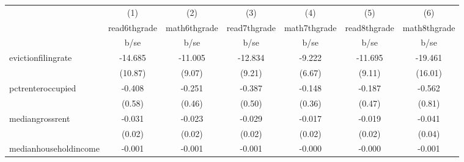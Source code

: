 {
\def\sym#1{\ifmmode^{#1}\else\(^{#1}\)\fi}
\begin{tabular}{l*{6}{c}}
\hline\hline
            &\multicolumn{1}{c}{(1)}           &\multicolumn{1}{c}{(2)}           &\multicolumn{1}{c}{(3)}           &\multicolumn{1}{c}{(4)}           &\multicolumn{1}{c}{(5)}           &\multicolumn{1}{c}{(6)}           \\
            &\multicolumn{1}{c}{read6thgrade}  &\multicolumn{1}{c}{math6thgrade}  &\multicolumn{1}{c}{read7thgrade}  &\multicolumn{1}{c}{math7thgrade}  &\multicolumn{1}{c}{read8thgrade}  &\multicolumn{1}{c}{math8thgrade}  \\
            &                     b/se         &                     b/se         &                     b/se         &                     b/se         &                     b/se         &                     b/se         \\
\hline
evictionfilingrate&                  -14.685         &                  -11.005         &                  -12.834         &                   -9.222         &                  -11.695         &                  -19.461         \\
            &                  (10.87)         &                   (9.07)         &                   (9.21)         &                   (6.67)         &                   (9.11)         &                  (16.01)         \\
pctrenteroccupied&                   -0.408         &                   -0.251         &                   -0.387         &                   -0.148         &                   -0.187         &                   -0.562         \\
            &                   (0.58)         &                   (0.46)         &                   (0.50)         &                   (0.36)         &                   (0.47)         &                   (0.81)         \\
mediangrossrent&                   -0.031         &                   -0.023         &                   -0.029         &                   -0.017         &                   -0.019         &                   -0.041         \\
            &                   (0.02)         &                   (0.02)         &                   (0.02)         &                   (0.02)         &                   (0.02)         &                   (0.04)         \\
medianhouseholdincome&                   -0.001         &                   -0.001         &                   -0.001         &                   -0.000         &                   -0.000         &                   -0.001         \\

\end{tabular}}

